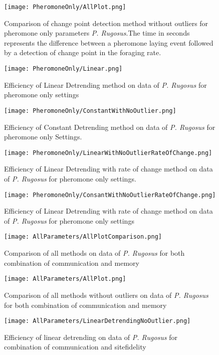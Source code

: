 \begin{figure}
	\texttt{[image: PheromoneOnly/AllPlot.png]}
	\caption{Comparison of change point detection method without outliers for pheromone only parameters \textit{P. Rugosus}.The time in seconds represents the difference between a pheromone laying event followed by a detection of change point in the foraging rate.}
\end{figure}
\begin{figure}
	\texttt{[image: PheromoneOnly/Linear.png]}
	\caption{Efficiency of Linear Detrending method on data of \textit{P. Rugosus} for pheromone only settings}
\end{figure}
\begin{figure}
	\texttt{[image: PheromoneOnly/ConstantWithNoOutlier.png]}
	\caption{Efficiency of Constant Detrending method on data of \textit{P. Rugosus} for pheromone only Settings.}
\end{figure}
\begin{figure}
	\texttt{[image: PheromoneOnly/LinearWithNoOutlierRateOfChange.png]}
	\caption{Efficiency of Linear Detrending with rate of change method on data of \textit{P. Rugosus} for pheromone only settings.}
\end{figure}
\begin{figure}
	\texttt{[image: PheromoneOnly/ConsantWithNoOutlierRateOfChange.png]}
	\caption{Efficiency of Linear Detrending with rate of change method on data of \textit{P. Rugosus} for pheromone only settings}
\end{figure}
\begin{figure}
	\texttt{[image: AllParameters/AllPlotComparison.png]}
	\caption{Comparison of all methods on data of \textit{P. Rugosus} for both combination of communication and memory}
\end{figure}
\begin{figure}
	\texttt{[image: AllParameters/AllPlot.png]}
	\caption{Comparison of all methods without outliers on data of \textit{P. Rugosus} for both combination of communication and memory}
\end{figure}
\begin{figure}
	\texttt{[image: AllParameters/LinearDetrendingNoOutlier.png]}
	\caption{Efficiency of linear detrending on data of \textit{P. Rugosus} for combination of communication and sitefidelity }
\end{figure}

